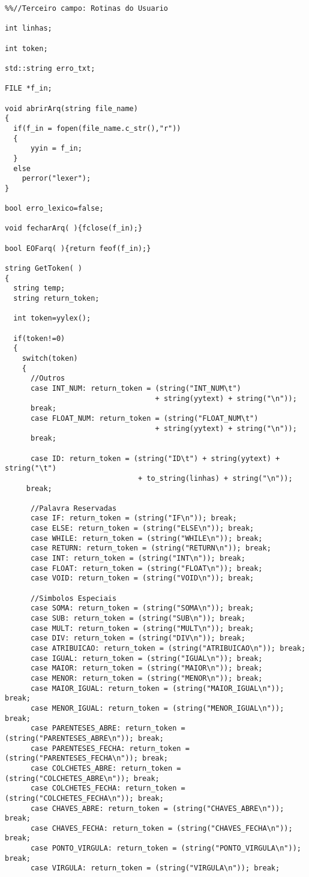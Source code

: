 \begin{lstlisting}
%%//Terceiro campo: Rotinas do Usuario

int linhas;

int token;

std::string erro_txt;

FILE *f_in;

void abrirArq(string file_name)
{
  if(f_in = fopen(file_name.c_str(),"r"))
  {
      yyin = f_in;
  }
  else
    perror("lexer");
}

bool erro_lexico=false;

void fecharArq( ){fclose(f_in);}

bool EOFarq( ){return feof(f_in);}

string GetToken( )
{
  string temp;
  string return_token;

  int token=yylex();

  if(token!=0)
  {
    switch(token)
    {
      //Outros
      case INT_NUM: return_token = (string("INT_NUM\t")
                                   + string(yytext) + string("\n"));
      break;
      case FLOAT_NUM: return_token = (string("FLOAT_NUM\t")
                                   + string(yytext) + string("\n"));
      break;
      
      case ID: return_token = (string("ID\t") + string(yytext) + string("\t")
                               + to_string(linhas) + string("\n"));
     break;

      //Palavra Reservadas
      case IF: return_token = (string("IF\n")); break;
      case ELSE: return_token = (string("ELSE\n")); break;
      case WHILE: return_token = (string("WHILE\n")); break;
      case RETURN: return_token = (string("RETURN\n")); break;
      case INT: return_token = (string("INT\n")); break;
      case FLOAT: return_token = (string("FLOAT\n")); break;
      case VOID: return_token = (string("VOID\n")); break;

      //Simbolos Especiais
      case SOMA: return_token = (string("SOMA\n")); break;
      case SUB: return_token = (string("SUB\n")); break;
      case MULT: return_token = (string("MULT\n")); break;
      case DIV: return_token = (string("DIV\n")); break;
      case ATRIBUICAO: return_token = (string("ATRIBUICAO\n")); break;
      case IGUAL: return_token = (string("IGUAL\n")); break;
      case MAIOR: return_token = (string("MAIOR\n")); break;
      case MENOR: return_token = (string("MENOR\n")); break;
      case MAIOR_IGUAL: return_token = (string("MAIOR_IGUAL\n")); break;
      case MENOR_IGUAL: return_token = (string("MENOR_IGUAL\n")); break;
      case PARENTESES_ABRE: return_token = (string("PARENTESES_ABRE\n")); break;
      case PARENTESES_FECHA: return_token = (string("PARENTESES_FECHA\n")); break;
      case COLCHETES_ABRE: return_token = (string("COLCHETES_ABRE\n")); break;
      case COLCHETES_FECHA: return_token = (string("COLCHETES_FECHA\n")); break;
      case CHAVES_ABRE: return_token = (string("CHAVES_ABRE\n")); break;
      case CHAVES_FECHA: return_token = (string("CHAVES_FECHA\n")); break;
      case PONTO_VIRGULA: return_token = (string("PONTO_VIRGULA\n")); break;
      case VIRGULA: return_token = (string("VIRGULA\n")); break;


\end{lstlisting}
